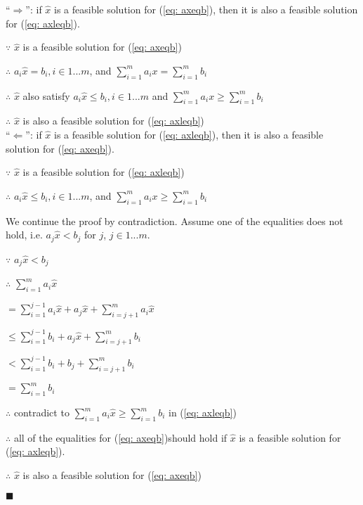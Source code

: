 ``$\Rightarrow $'': if $\widehat{x}$ is a feasible solution for (\ref{eq: axeqb}), then it is also a feasible solution for (\ref{eq: axleqb}).

$\because$ $\widehat{x}$ is a feasible solution for (\ref{eq: axeqb})

$\therefore$  $a_{i}\widehat{x}=b_{i}, i\in 1...m$, and $\sum\limits_{i=1}^m a_{i}x=\sum\limits_{i=1}^m b_{i}$

$\therefore$  $\widehat{x}$ also satisfy $a_{i}\widehat{x}\leq b_{i}, i\in 1...m$ and $\sum\limits_{i=1}^m a_{i}x\geq \sum\limits_{i=1}^m b_{i}$

$\therefore$  $\widehat{x}$ is also a feasible solution for (\ref{eq: axleqb})
\\

``$\Leftarrow $'': if $\widehat{x}$ is a feasible solution for (\ref{eq: axleqb}), then it is also a feasible solution for (\ref{eq: axeqb}).

$\because$ $\widehat{x}$ is a feasible solution for (\ref{eq: axleqb})

$\therefore$  $a_{i}\widehat{x}\leq b_{i}, i\in 1...m$, and $\sum\limits_{i=1}^m a_{i}x\geq \sum\limits_{i=1}^m b_{i}$

We continue the proof by contradiction. Assume one of the equalities does not hold, i.e.  $a_{j}\widehat{x}<b_{j}$ for $j$, $j\in 1...m$.

$\because$ $a_{j}\widehat{x}<b_{j}$

$\therefore$  $\sum\limits_{i=1}^m a_{i}\widehat{x}$

$ = \sum\limits_{i=1}^{j-1} a_{i}\widehat{x} + a_{j}\widehat{x} + \sum\limits_{i=j+1}^{m} a_{i}\widehat{x}$

$ \leq \sum\limits_{i=1}^{j-1} b_{i} + a_{j}\widehat{x} + \sum\limits_{i=j+1}^{m} b_{i}$

$ <  \sum\limits_{i=1}^{j-1} b_{i} + b_{j} + \sum\limits_{i=j+1}^{m} b_{i}$

$ = \sum\limits_{i=1}^m b_{i}$

$\therefore$ contradict to $\sum\limits_{i=1}^m a_{i}\widehat{x} \geq \sum\limits_{i=1}^m b_{i}$ in  (\ref{eq: axleqb})

$\therefore$ all of the equalities for (\ref{eq: axeqb})should hold if $\widehat{x}$ is a feasible solution for (\ref{eq: axleqb}). 

$\therefore$ $\widehat{x}$ is also a feasible solution for (\ref{eq: axeqb}) 
\begin{flushright} $\blacksquare$ \end{flushright}

